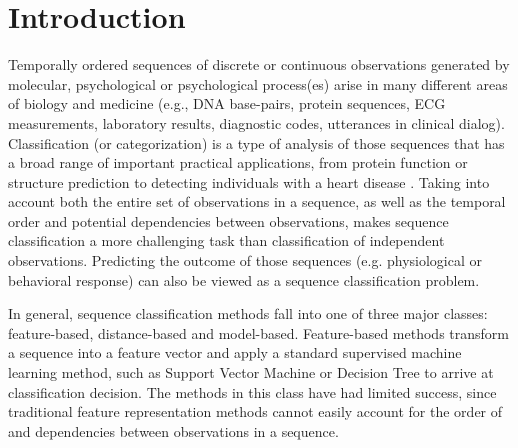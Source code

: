 \documentclass{amia_summit_2018}
\begin{document}
\section*{Introduction}
Temporally ordered sequences of discrete or continuous observations generated by molecular, psychological or psychological process(es) arise in many different areas of biology and medicine (e.g., DNA base-pairs, protein sequences, ECG measurements, laboratory results, diagnostic codes, utterances  in clinical dialog). Classification (or categorization) is a type of analysis of those sequences that has a broad range of important practical applications, from protein function \cite{yakhnenko2005discriminatively} or structure \cite{deshpande2002evaluation} prediction to detecting individuals with a heart disease \cite{wei2006semi}. Taking into account both the entire set of observations in a sequence, as well as the temporal order and potential dependencies between observations, makes sequence classification a more challenging task than classification of independent observations. Predicting the outcome of those sequences (e.g. physiological or behavioral response) can also be viewed as a sequence classification problem.

In general, sequence classification methods fall into one of three major classes: feature-based, distance-based and model-based. Feature-based methods transform a sequence into a feature vector and apply a standard supervised machine learning method, such as Support Vector Machine \cite{leslie2004fast} or Decision Tree \cite{chuzhanova1998feature} to arrive at classification decision. The methods in this class have had limited success, since traditional feature representation methods cannot easily account for the order of and dependencies between observations in a
sequence.
\end{document}
